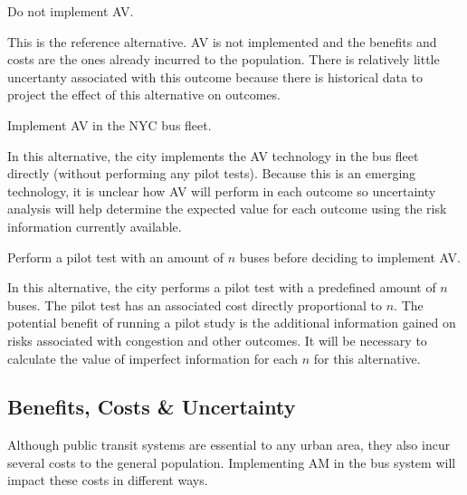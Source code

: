 \documentclass[11pt, letterpaper]{article}
\begin{document}
\begin{description}[leftmargin=0pt]
\item[Alternative 1:] Do not implement AV.

This is the reference alternative. AV is not implemented and the
benefits and costs are the ones already incurred to the population.
There is relatively little uncertanty associated with this outcome
because there is historical data to project the effect of this
alternative on outcomes.

\item[Alternative 2:] Implement AV in the NYC bus fleet.

In this alternative, the city implements the AV technology in the bus
fleet directly (without performing any pilot tests).  Because this is
an emerging technology, it is unclear how AV will perform in each
outcome so uncertainty analysis will help determine the expected value
for each outcome using the risk information currently available.

\item[Alternative 3:] Perform a pilot test with an amount of $n$ buses
  before deciding to implement AV.

In this alternative, the city performs a pilot test with a predefined
amount of $n$ buses. The pilot test has an associated cost directly
proportional to $n$.  The potential benefit of running a pilot study
is the additional information gained on risks associated with
congestion and other outcomes.  It will be necessary to calculate the
value of imperfect information for each $n$ for this alternative.


\end{description}

\subsection{Benefits, Costs \& Uncertainty}

Although public transit systems are essential to any urban area, they 
also incur several costs to the general population. Implementing AM 
in the bus system will impact these costs in different ways.
\end{document}
